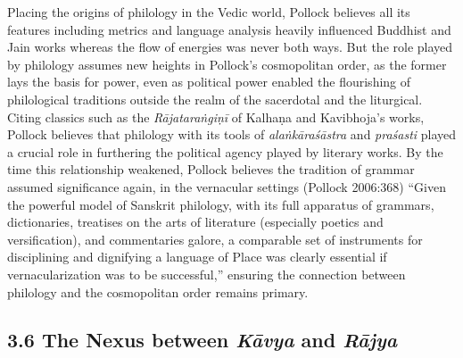 Placing the origins of philology in the Vedic world, Pollock believes all its features including metrics and language analysis heavily influenced Buddhist and Jain works whereas the flow of energies was never both ways. But the role played by philology assumes new heights in Pollock’s cosmopolitan order, as the former lays the basis for power, even as political power enabled the flourishing of philological traditions outside the realm of the sacerdotal and the liturgical. Citing classics such as the \textit{Rājataraṅgiṇī} of Kalhaṇa and Kavibhoja’s works, Pollock believes that philology with its tools of \textit{alaṅkāraśāstra} and \textit{praśasti} played a crucial role in furthering the political agency played by literary works. By the time this relationship weakened, Pollock believes the tradition of grammar assumed significance again, in the vernacular settings (Pollock 2006:368) “Given the powerful model of Sanskrit philology, with its full apparatus of grammars, dictionaries, treatises on the arts of literature (especially poetics and versification), and commentaries galore, a comparable set of instruments for disciplining and dignifying a language of Place was clearly essential if vernacularization was to be successful,” ensuring the connection between philology and the cosmopolitan order remains primary.


\subsection*{3.6 The Nexus between \textit{Kāvya} and \textit{Rājya}}

